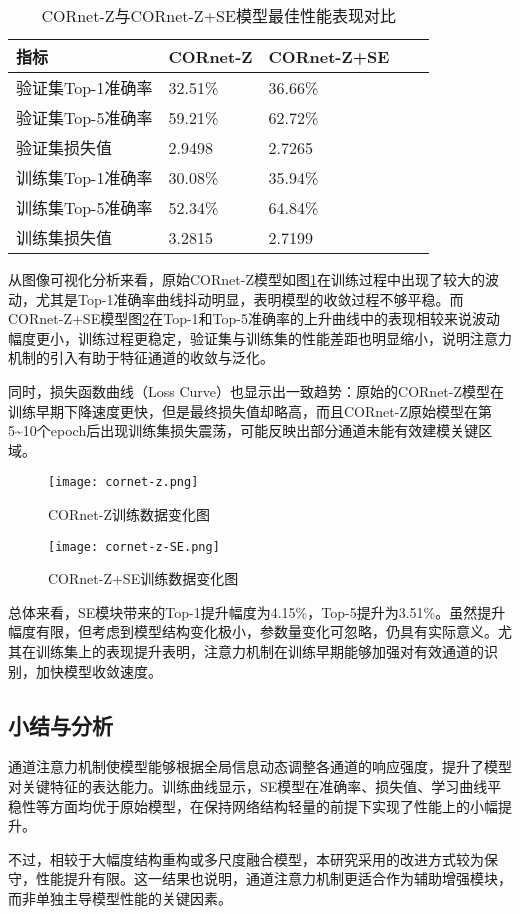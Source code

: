 \begin{table}[htb]
	\centering
	\caption{CORnet-Z与CORnet-Z+SE模型最佳性能表现对比}
	\label{tab:CORnet-Z与CORnet-Z+SE模型最佳性能表现对比}
	\begin{tabular}{lllll}
		\hline
		指标& CORnet-Z & CORnet-Z+SE \\
		\hline
		验证集Top-1准确率 & 32.51\% & 36.66\%  \\
		验证集Top-5准确率 & 59.21\% & 62.72\%  \\
		验证集损失值 & 2.9498 & 2.7265  \\
		训练集Top-1准确率 & 30.08\% & 35.94\%  \\
		训练集Top-5准确率 & 52.34\% & 64.84\%  \\
		训练集损失值 & 3.2815 & 2.7199  \\
		\hline
	\end{tabular}
\end{table}

从图像可视化分析来看，原始CORnet-Z模型如图\ref{f.zzxt}在训练过程中出现了较大的波动，尤其是Top-1准确率曲线抖动明显，表明模型的收敛过程不够平稳。而CORnet-Z+SE模型图\ref{f.zsezxt}在Top-1和Top-5准确率的上升曲线中的表现相较来说波动幅度更小，训练过程更稳定，验证集与训练集的性能差距也明显缩小，说明注意力机制的引入有助于特征通道的收敛与泛化。

同时，损失函数曲线（Loss Curve）也显示出一致趋势：原始的CORnet-Z模型在训练早期下降速度更快，但是最终损失值却略高，而且CORnet-Z原始模型在第5\textasciitilde10个epoch后出现训练集损失震荡，可能反映出部分通道未能有效建模关键区域。

\begin{figure}[hbt]
	\centering
	\texttt{[image: cornet-z.png]}
	\caption{CORnet-Z训练数据变化图}
	\label{f.zzxt}
\end{figure}

\begin{figure}[hbt]
	\centering
	\texttt{[image: cornet-z-SE.png]}
	\caption{CORnet-Z+SE训练数据变化图}
	\label{f.zsezxt}
\end{figure}

总体来看，SE模块带来的Top-1提升幅度为4.15\%，Top-5提升为3.51\%。虽然提升幅度有限，但考虑到模型结构变化极小，参数量变化可忽略，仍具有实际意义。尤其在训练集上的表现提升表明，注意力机制在训练早期能够加强对有效通道的识别，加快模型收敛速度。

\subsection{小结与分析}

通道注意力机制使模型能够根据全局信息动态调整各通道的响应强度，提升了模型对关键特征的表达能力。训练曲线显示，SE模型在准确率、损失值、学习曲线平稳性等方面均优于原始模型，在保持网络结构轻量的前提下实现了性能上的小幅提升。

不过，相较于大幅度结构重构或多尺度融合模型，本研究采用的改进方式较为保守，性能提升有限。这一结果也说明，通道注意力机制更适合作为辅助增强模块，而非单独主导模型性能的关键因素。
